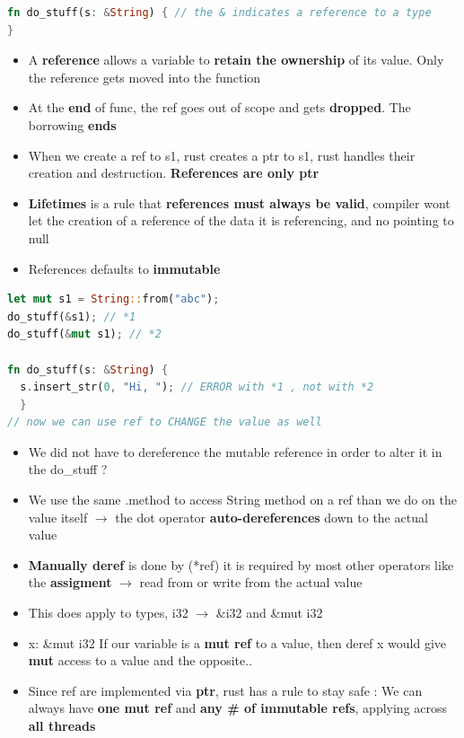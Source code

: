 \documentclass{report}
\begin{document}
\begin{multicols*}{2}
\begin{tcolorbox}[colback=backcolour,size=small,left=4mm]
\begin{lstlisting}[language=rust]
fn do_stuff(s: &String) { // the & indicates a reference to a type
}
\end{lstlisting}
\end{tcolorbox}

\begin{itemize}
  \item A \textbf{reference} allows a variable to \textbf{retain the ownership} of its value. Only the reference gets  moved into the function 
  \item At the \textbf{end} of func, the ref goes out of scope and gets \textbf{dropped}. The borrowing \textbf{ends} 
  \item When we create a ref to s1, rust creates a ptr to s1, rust handles their creation and destruction. \textbf{References are only ptr}
  \item \textbf{Lifetimes} is a rule that \textbf{references must always be valid}, compiler wont let the creation of a reference of the data it is referencing, and no pointing to null 
  \item References defaults to \textbf{immutable} 
\end{itemize}


\begin{tcolorbox}[title=Mut ref to a mut value,colback=backcolour,size=small,left=4mm]
\begin{lstlisting}[language=rust]
let mut s1 = String::from("abc");
do_stuff(&s1); // *1
do_stuff(&mut s1); // *2

fn do_stuff(s: &String) {
  s.insert_str(0, "Hi, "); // ERROR with *1 , not with *2
  }
// now we can use ref to CHANGE the value as well
\end{lstlisting}
\end{tcolorbox}

\begin{itemize}
  \item We did not have to dereference the mutable reference in order to alter it in the do\_stuff ? 
  \item We use the same .method to access String method on a ref than we do on the value itself
    $\rightarrow$ the dot operator \textbf{auto-dereferences} down to the actual value 
  \item \textbf{Manually deref} is done by (*ref) it is required by most other operators like the \textbf{assigment} $\rightarrow$ read from or write from the actual value 
  \item This does apply to types, i32 $\rightarrow$ \&i32 and \&mut i32 
  \item x: \&mut i32 If our variable is a \textbf{mut ref} to a value, then deref x would give \textbf{mut} access to a value and the opposite.. 
  \item Since ref are implemented via \textbf{ptr}, rust has a rule to stay safe :
    We can always have \textbf{one mut ref} and \textbf{any \# of immutable refs}, applying across \textbf{all threads}  
\end{itemize}


\end{multicols*}
\end{document}
